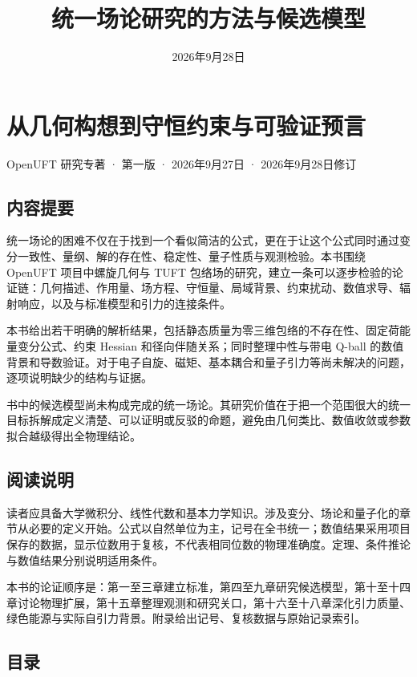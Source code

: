 \documentclass[UTF8,fontset=fandol,11pt]{ctexart}
\title{统一场论研究的方法与候选模型}
\author{}
\date{2026年9月28日}
\begin{document}
\maketitle

\section*{从几何构想到守恒约束与可验证预言}

OpenUFT 研究专著 · 第一版 · 2026年9月27日 · 2026年9月28日修订

\subsection*{内容提要}

统一场论的困难不仅在于找到一个看似简洁的公式，更在于让这个公式同时通过变分一致性、量纲、解的存在性、稳定性、量子性质与观测检验。本书围绕 OpenUFT 项目中螺旋几何与 TUFT 包络场的研究，建立一条可以逐步检验的论证链：几何描述、作用量、场方程、守恒量、局域背景、约束扰动、数值求导、辐射响应，以及与标准模型和引力的连接条件。

本书给出若干明确的解析结果，包括静态质量为零三维包络的不存在性、固定荷能量变分公式、约束 Hessian 和径向伴随关系；同时整理中性与带电 Q-ball 的数值背景和导数验证。对于电子自旋、磁矩、基本耦合和量子引力等尚未解决的问题，逐项说明缺少的结构与证据。

书中的候选模型尚未构成完成的统一场论。其研究价值在于把一个范围很大的统一目标拆解成定义清楚、可以证明或反驳的命题，避免由几何类比、数值收敛或参数拟合越级得出全物理结论。

\subsection*{阅读说明}

读者应具备大学微积分、线性代数和基本力学知识。涉及变分、场论和量子化的章节从必要的定义开始。公式以自然单位为主，记号在全书统一；数值结果采用项目保存的数据，显示位数用于复核，不代表相同位数的物理准确度。定理、条件推论与数值结果分别说明适用条件。

本书的论证顺序是：第一至三章建立标准，第四至九章研究候选模型，第十至十四章讨论物理扩展，第十五章整理观测和研究关口，第十六至十八章深化引力质量、绿色能源与实际自引力背景。附录给出记号、复核数据与原始记录索引。

\subsection*{目录}
\end{document}
